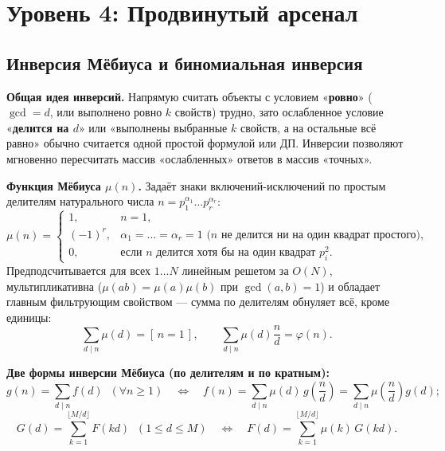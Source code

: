 \documentclass[10pt,a4paper]{article}
\renewcommand{\le}{\leqslant}
\renewcommand{\ge}{\geqslant}
\newcommand{\iverson}[1]{[\,#1\,]}
\begin{document}
\section{Уровень 4: Продвинутый арсенал}

\subsection{Инверсия Мёбиуса и биномиальная инверсия}

\textbf{Общая идея инверсий.} Напрямую считать объекты с условием «\textbf{ровно}» ($\gcd = d$, или выполнено ровно $k$ свойств) трудно, зато ослабленное условие «\textbf{делится на $d$}» или «выполнены выбранные $k$ свойств, а на остальные всё равно» обычно считается одной простой формулой или ДП. Инверсии позволяют мгновенно пересчитать массив «ослабленных» ответов в массив «точных».

\textbf{Функция Мёбиуса $\mu(n)$.} Задаёт знаки включений-исключений по простым делителям натурального числа $n = p_1^{\alpha_1} \dots p_r^{\alpha_r}$:
\[
  \mu(n) =
  \begin{cases}
    1, & n = 1, \\
    (-1)^r, & \alpha_1 = \dots = \alpha_r = 1 \text{ ($n$ не делится ни на один квадрат простого)}, \\
    0, & \text{если $n$ делится хотя бы на один квадрат } p_i^2.
  \end{cases}
\]
Предподсчитывается для всех $1 \dots N$ линейным решетом за $O(N)$, мультипликативна ($\mu(ab) = \mu(a)\mu(b)$ при $\gcd(a, b) = 1$) и обладает главным фильтрующим свойством — сумма по делителям обнуляет всё, кроме единицы:
\[
  \sum_{d \mid n} \mu(d) = \iverson{n = 1}, \qquad \sum_{d \mid n} \mu(d)\frac{n}{d} = \varphi(n).
\]

\textbf{Две формы инверсии Мёбиуса (по делителям и по кратным):}
\[
  g(n) = \sum_{d \mid n} f(d) \;\; (\forall n \ge 1) \quad \Longleftrightarrow \quad
  f(n) = \sum_{d \mid n} \mu(d)\, g\!\left(\frac{n}{d}\right) = \sum_{d \mid n} \mu\!\left(\frac{n}{d}\right) g(d);
\]
\[
  G(d) = \sum_{k=1}^{\lfloor M / d \rfloor} F(kd) \;\; (1 \le d \le M) \quad \Longleftrightarrow \quad
  F(d) = \sum_{k=1}^{\lfloor M / d \rfloor} \mu(k)\, G(kd).
\]
\end{document}
